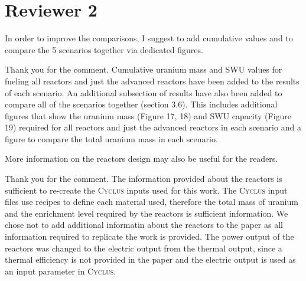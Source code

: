 \documentclass[answers,11pt]{exam}
\newcommand{\Cyclus}{\textsc{Cyclus}\xspace}%
\begin{document}
\section*{Reviewer 2}
\begin{questions}
        \question In order to improve the comparisons, I suggest to add 
        cumulative values and to compare the 5 scenarios together via dedicated 
        figures.
        \begin{solution}
                Thank you for the comment. Cumulative uranium mass and \gls{SWU} values
                for fueling all reactors and just the advanced reactors 
                have been added to the results of each scenario. An additional 
                subsection of results have also been added to compare all of the 
                scenarios together (section 3.6). This includes additional figures 
                that show the uranium mass (Figure 17, 18) and SWU capacity (Figure 19)
                required for all reactors and just the advanced reactors in each 
                scenario and a figure to compare the total uranium mass in each 
                scenario. 
        \end{solution}

        \question More information on the reactors design may also be useful 
        for the readers.
        \begin{solution}
                Thank you for the comment. The information provided about the reactors 
                is sufficient to re-create the \Cyclus inputs used for this work.
                The \Cyclus input files use recipes to define each material used, 
                therefore the total mass of uranium and the enrichment level 
                required by the reactors is sufficient information. We chose not to 
                add additional informatin about the reactors to the paper as all 
                information required to replicate the work is provided.
                The power output of the reactors was changed to the electric 
                output from the thermal output, since a thermal efficiency is not 
                provided in the paper and the electric output is used as an input 
                parameter in \Cyclus. 
        \end{solution}


\end{questions}
\end{document}
